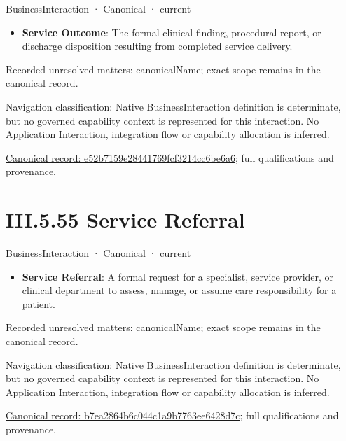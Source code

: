 \label{element:e52b7159e28441769fcf3214cc6be6a6}
{\small BusinessInteraction · Canonical · current}\par

\begin{itemize}


\item \textbf{Service Outcome}: The formal clinical finding, procedural report, or discharge disposition resulting from completed service delivery.

\end{itemize}

{\small Recorded unresolved matters: canonicalName; exact scope remains in the canonical record.}\par
{\small Navigation classification: Native BusinessInteraction definition is determinate, but no governed capability context is represented for this interaction. No Application Interaction, integration flow or capability allocation is inferred.}\par
{\footnotesize \href{../../../../../../../continuum/business/business-interaction/e52b7159e28441769fcf3214cc6be6a6.md}{Canonical record: e52b7159e28441769fcf3214cc6be6a6}; full qualifications and provenance.}\par
\section*{III.5.55 Service Referral}
\label{navigation:III.5.55}

\label{element:b7ea2864b6c044c1a9b7763ee6428d7c}
{\small BusinessInteraction · Canonical · current}\par

\begin{itemize}


\item \textbf{Service Referral}: A formal request for a specialist, service provider, or clinical department to assess, manage, or assume care responsibility for a patient.

\end{itemize}

{\small Recorded unresolved matters: canonicalName; exact scope remains in the canonical record.}\par
{\small Navigation classification: Native BusinessInteraction definition is determinate, but no governed capability context is represented for this interaction. No Application Interaction, integration flow or capability allocation is inferred.}\par
{\footnotesize \href{../../../../../../../continuum/business/business-interaction/b7ea2864b6c044c1a9b7763ee6428d7c.md}{Canonical record: b7ea2864b6c044c1a9b7763ee6428d7c}; full qualifications and provenance.}\par
